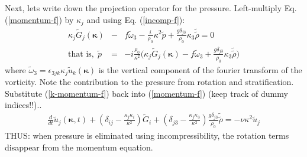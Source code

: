 \documentclass[12pt]{article}
\newcommand{\bk}{\bm{\kappa}}
\newcommand{\kp}{\kappa}
\begin{document}
Next, lets write down the projection operator for the pressure.
Left-multiply Eq. (\ref{momentum-f}) by $\kp_j$ and using Eq. (\ref{incomp-f}):
\begin{eqnarray}
\kp_j\tilde G_j(\bk) &-& f \tilde \omega_3 - \frac{i}{\rho_0} \kp^2 \tilde p +  
\frac{g\delta_{j3}}{\rho_0}\kp_3\tilde{\tilde \rho} = 0\nonumber\\
\mbox{that~is,}~~\tilde p &=& -i\frac{\rho_0}{\kp^2}
\Big(\kp_j\tilde G_j(\bk) - f \tilde \omega_3 
+  \frac{g\delta_{j3}}{\rho_0}\kp_3\tilde{\tilde \rho}\Big) 
\label{k-momentum-f}
\end{eqnarray}
where $\tilde\omega_3=\epsilon_{3jk}\kp_j \tilde u_k(\bk)$ is the
vertical component of the fourier transform of the vorticity. Note the contribution to the pressure from rotation and stratification. Substitute (\ref{k-momentum-f}) back into (\ref{momentum-f}) (keep track of dummy indices!!)..
\begin{eqnarray}
\frac{d}{dt} \tilde u_j(\bm{\kappa},t)  + (\delta_{ij}-\frac{\kappa_j \kp_i}{\kp^2}) \tilde G_i + (\delta_{j3} - \frac{\kp_j \kp_3}{\kp^2})\frac{g\delta_{j3}}{\rho_0}\tilde{\tilde \rho} =  -\nu\kappa^2 \tilde u_j
\label{momentum-f-elimp}
\end{eqnarray}
THUS: when pressure is eliminated using incompressibility, the rotation terms disappear from the momentum equation.
\end{document}
